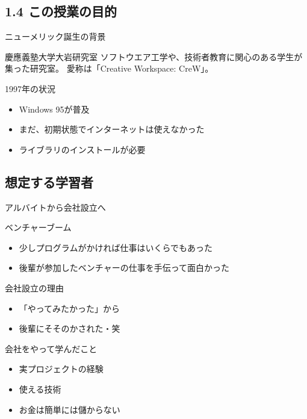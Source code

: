 \documentclass{beamer}
\begin{document}
\subsection{1.4 この授業の目的}

\label{sec-2}
\begin{frame}[label=sec-2-1]{ニューメリック誕生の背景}
\begin{block}{慶應義塾大学大岩研究室}
ソフトウエア工学や、技術者教育に関心のある学生が集った研究室。
愛称は「Creative Workspace: CreW」。
\end{block}
\begin{block}{1997年の状況}
\begin{itemize}
\item Windows 95が普及
\item まだ、初期状態でインターネットは使えなかった
\item ライブラリのインストールが必要
\end{itemize}
\end{block}
\end{frame}

\subsection{想定する学習者}

\begin{frame}[label=sec-2-2]{アルバイトから会社設立へ}
\begin{block}{ベンチャーブーム}
\begin{itemize}
\item 少しプログラムがかければ仕事はいくらでもあった
\item 後輩が参加したベンチャーの仕事を手伝って面白かった
\end{itemize}
\end{block}
\begin{block}{会社設立の理由}
\begin{itemize}
\item 「やってみたかった」から
\item 後輩にそそのかされた・笑
\end{itemize}
\end{block}
\begin{block}{会社をやって学んだこと}
\begin{itemize}
\item 実プロジェクトの経験
\item 使える技術
\item お金は簡単には儲からない
\end{itemize}
\end{block}
\end{frame}
\end{document}
